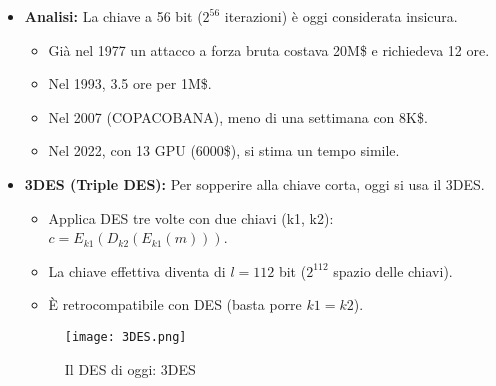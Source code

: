 \documentclass[../main.tex]{subfiles}
\begin{document}
\begin{itemize}
    \item \textbf{Analisi:} La chiave a 56 bit ($2^{56}$ iterazioni) è oggi considerata insicura.
          \begin{itemize}
              \item Già nel 1977 un attacco a forza bruta costava 20M\$ e richiedeva 12 ore.
              \item Nel 1993, 3.5 ore per 1M\$.
              \item Nel 2007 (COPACOBANA), meno di una settimana con 8K\$.
              \item Nel 2022, con 13 GPU (6000\$), si stima un tempo simile.
          \end{itemize}
    \item \textbf{3DES (Triple DES):} Per sopperire alla chiave corta, oggi si usa il 3DES.
          \begin{itemize}
              \item Applica DES tre volte con due chiavi (k1, k2): $c = E_{k1}(D_{k2}(E_{k1}(m)))$.
              \item La chiave effettiva diventa di $l=112$ bit ($2^{112}$ spazio delle chiavi).
              \item È retrocompatibile con DES (basta porre $k1=k2$).
          \end{itemize}
          
    \begin{figure}[H]
      \centering
      \texttt{[image: 3DES.png]}
      \caption{Il DES di oggi: 3DES}
      \label{fig:etichetta}
    \end{figure}
    
\end{itemize}
\end{document}
